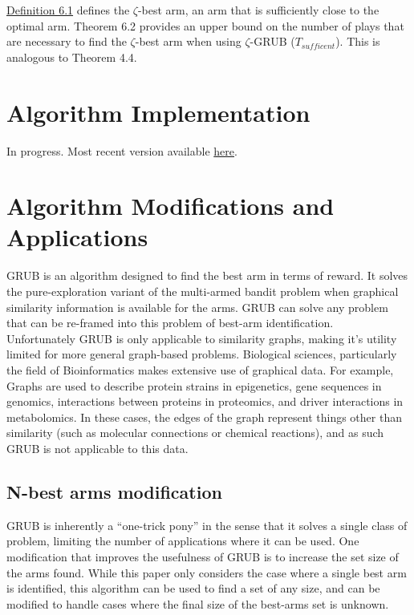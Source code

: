 \documentclass{article}[12pt]
\begin{document}
\underline{Definition 6.1} defines the $\zeta$-best arm, an arm that is sufficiently close to the optimal arm.
Theorem 6.2 provides an upper bound on the number of plays that are necessary to find the $\zeta$-best arm when using $\zeta$-GRUB ($T_{sufficent}$). This is analogous to Theorem 4.4.


\section{Algorithm Implementation}

In progress.
Most recent version available \href{https://github.com/sstalley/RPE_GRUB}{here}.

\section{Algorithm Modifications and Applications}

GRUB is an algorithm designed to find the best arm in terms of reward.
It solves the pure-exploration variant of the multi-armed bandit problem when graphical similarity information is available for the arms.
GRUB can solve any problem that can be re-framed into this problem of best-arm identification. \\

Unfortunately GRUB is only applicable to similarity graphs, making it’s utility limited for more general graph-based problems.
Biological sciences, particularly the field of Bioinformatics makes extensive use of graphical data.
For example, Graphs are used to describe protein strains in epigenetics, gene sequences in genomics, interactions between proteins in proteomics, and driver interactions in metabolomics.
In these cases, the edges of the graph represent things other than similarity (such as molecular connections or chemical reactions), and as such GRUB is not applicable to this data.

\subsection{N-best arms modification}

GRUB is inherently a ``one-trick pony'' in the sense that it solves a single class of problem, limiting the number of applications where it can be used.
One modification that improves the usefulness of GRUB is to increase the set size of the arms found.
While this paper only considers the case where a single best arm is identified, this algorithm can be used to find a set of any size,
and can be modified to handle cases where the final size of the best-arms set is unknown. \\
\end{document}

